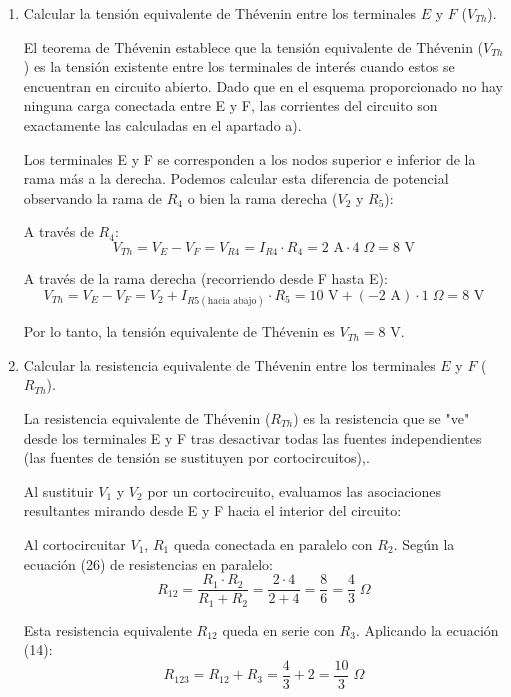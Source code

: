 \documentclass[11pt, a4paper]{article}
\newenvironment{problem}[1][Cuestión]{
		\vspace{0.5cm}
		\noindent{\Large\bfseries #1} \par\vspace{0.5cm}
}{
		\vspace{0.5cm}
}
\begin{document}
\begin{problem}[Problema]
\begin{enumerate}[label=\alph*)]
			\item Calcular la tensión equivalente de Thévenin entre los terminales $E$ y $F$ ($V_{Th}$).

				{ \color{blue} 
					El teorema de Thévenin establece que la tensión equivalente de Thévenin ($V_{Th}$) es la tensión existente entre los terminales de interés cuando estos se encuentran en circuito abierto. Dado que en el esquema proporcionado no hay ninguna carga conectada entre E y F, las corrientes del circuito son exactamente las calculadas en el apartado a).

					Los terminales E y F se corresponden a los nodos superior e inferior de la rama más a la derecha. Podemos calcular esta diferencia de potencial observando la rama de $R_4$ o bien la rama derecha ($V_2$ y $R_5$):

					A través de $R_4$:
					$$V_{Th} = V_E - V_F = V_{R4} = I_{R4} \cdot R_4 = 2 \text{ A} \cdot 4 \;\Omega = 8 \text{ V}$$

					A través de la rama derecha (recorriendo desde F hasta E):
					$$V_{Th} = V_E - V_F = V_2 + I_{R5 (\text{hacia abajo})} \cdot R_5 = 10 \text{ V} + (-2 \text{ A}) \cdot 1 \;\Omega = 8 \text{ V}$$

					Por lo tanto, la tensión equivalente de Thévenin es $\boxed{V_{Th} = 8 \text{ V}}$.
				}

			\vspace{0.5cm}

			\item Calcular la resistencia equivalente de Thévenin entre los terminales $E$ y $F$ ($R_{Th}$).

				{ \color{blue} 
					La resistencia equivalente de Thévenin ($R_{Th}$) es la resistencia que se "ve" desde los terminales E y F tras desactivar todas las fuentes independientes (las fuentes de tensión se sustituyen por cortocircuitos),.

					Al sustituir $V_1$ y $V_2$ por un cortocircuito, evaluamos las asociaciones resultantes mirando desde E y F hacia el interior del circuito:

					Al cortocircuitar $V_1$, $R_1$ queda conectada en paralelo con $R_2$. Según la ecuación (26) de resistencias en paralelo:
					$$R_{12} = \frac{R_1 \cdot R_2}{R_1 + R_2} = \frac{2 \cdot 4}{2 + 4} = \frac{8}{6} = \frac{4}{3} \;\Omega$$

					Esta resistencia equivalente $R_{12}$ queda en serie con $R_3$. Aplicando la ecuación (14):
					$$R_{123} = R_{12} + R_3 = \frac{4}{3} + 2 = \frac{10}{3} \;\Omega$$

}
\end{enumerate}
\end{problem}
\end{document}

